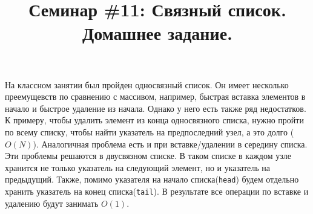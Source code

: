 \documentclass{article}
\begin{document}



\title{Семинар \#11: Связный список. Домашнее задание.\vspace{-5ex}}\date{}\maketitle
На классном занятии был пройден односвязный список. Он имеет несколько преемущевств по сравнению с массивом, например, быстрая вставка элементов в начало и быстрое удаление из начала. Однако у него есть также ряд недостатков. К примеру, чтобы удалить элемент из конца односвязного списка, нужно пройти по всему списку, чтобы найти указатель на предпоследний узел, а это долго ($O(N)$). Аналогичная проблема есть и при вставке/удалении в середину списка. Эти проблемы решаются в двусвязном списке. В таком списке в каждом узле хранится не только указатель на следующий элемент, но и указатель на предыдущий. Также, помимо указателя на начало списка(\texttt{head}) будем отдельно хранить указатель на конец списка(\texttt{tail}). В результате все операции по вставке и удалению будут занимать $O(1)$.\\
\end{document}
